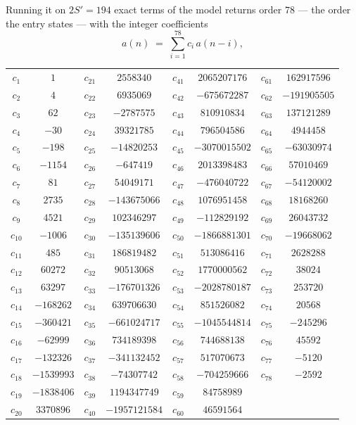 \documentclass[11pt,a4paper]{article}
\theoremstyle{plain}
\theoremstyle{definition}
\begin{document}
Running it on $2S'=194$ exact terms of the model returns order $78$ --- the order the
entry states --- with the integer coefficients
\[
a(n)\;=\;\sum_{i=1}^{78}c_i\,a(n-i),
\]
\begin{center}\small
\begin{tabular}{cccccccc}
$c_{1}$ & $1$ & $c_{21}$ & $2558340$ & $c_{41}$ & $2065207176$ & $c_{61}$ & $162917596$ \\
$c_{2}$ & $4$ & $c_{22}$ & $6935069$ & $c_{42}$ & $-675672287$ & $c_{62}$ & $-191905505$ \\
$c_{3}$ & $62$ & $c_{23}$ & $-2787575$ & $c_{43}$ & $810910834$ & $c_{63}$ & $137121289$ \\
$c_{4}$ & $-30$ & $c_{24}$ & $39321785$ & $c_{44}$ & $796504586$ & $c_{64}$ & $4944458$ \\
$c_{5}$ & $-198$ & $c_{25}$ & $-14820253$ & $c_{45}$ & $-3070015502$ & $c_{65}$ & $-63030974$ \\
$c_{6}$ & $-1154$ & $c_{26}$ & $-647419$ & $c_{46}$ & $2013398483$ & $c_{66}$ & $57010469$ \\
$c_{7}$ & $81$ & $c_{27}$ & $54049171$ & $c_{47}$ & $-476040722$ & $c_{67}$ & $-54120002$ \\
$c_{8}$ & $2735$ & $c_{28}$ & $-143675066$ & $c_{48}$ & $1076951458$ & $c_{68}$ & $18168260$ \\
$c_{9}$ & $4521$ & $c_{29}$ & $102346297$ & $c_{49}$ & $-112829192$ & $c_{69}$ & $26043732$ \\
$c_{10}$ & $-1006$ & $c_{30}$ & $-135139606$ & $c_{50}$ & $-1866881301$ & $c_{70}$ & $-19668062$ \\
$c_{11}$ & $485$ & $c_{31}$ & $186819482$ & $c_{51}$ & $513086416$ & $c_{71}$ & $2628288$ \\
$c_{12}$ & $60272$ & $c_{32}$ & $90513068$ & $c_{52}$ & $1770000562$ & $c_{72}$ & $38024$ \\
$c_{13}$ & $63297$ & $c_{33}$ & $-176701326$ & $c_{53}$ & $-2028780187$ & $c_{73}$ & $253720$ \\
$c_{14}$ & $-168262$ & $c_{34}$ & $639706630$ & $c_{54}$ & $851526082$ & $c_{74}$ & $20568$ \\
$c_{15}$ & $-360421$ & $c_{35}$ & $-661024717$ & $c_{55}$ & $-1045544814$ & $c_{75}$ & $-245296$ \\
$c_{16}$ & $-62999$ & $c_{36}$ & $734189398$ & $c_{56}$ & $744688138$ & $c_{76}$ & $45592$ \\
$c_{17}$ & $-132326$ & $c_{37}$ & $-341132452$ & $c_{57}$ & $517070673$ & $c_{77}$ & $-5120$ \\
$c_{18}$ & $-1539993$ & $c_{38}$ & $-74307742$ & $c_{58}$ & $-704259666$ & $c_{78}$ & $-2592$ \\
$c_{19}$ & $-1838406$ & $c_{39}$ & $1194347749$ & $c_{59}$ & $84758989$ &  &  \\
$c_{20}$ & $3370896$ & $c_{40}$ & $-1957121584$ & $c_{60}$ & $46591564$ &  &  \\
\end{tabular}
\end{center}
\end{document}

